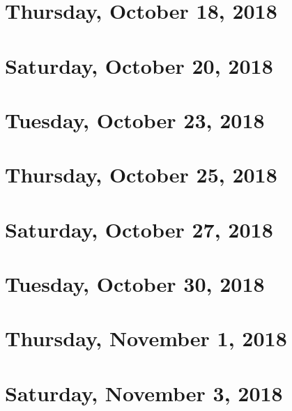 \documentclass[reqno]{amsart}
\begin{document}
\section{Thursday, October 18, 2018}
    

\section{Saturday, October 20, 2018}
    
    
\section{Tuesday, October 23, 2018}
    

\section{Thursday, October 25, 2018}
    
    
\section{Saturday, October 27, 2018}
    
    
\section{Tuesday, October 30, 2018}
    
    
\section{Thursday, November 1, 2018}
    

\section{Saturday, November 3, 2018}
    
\end{document}
